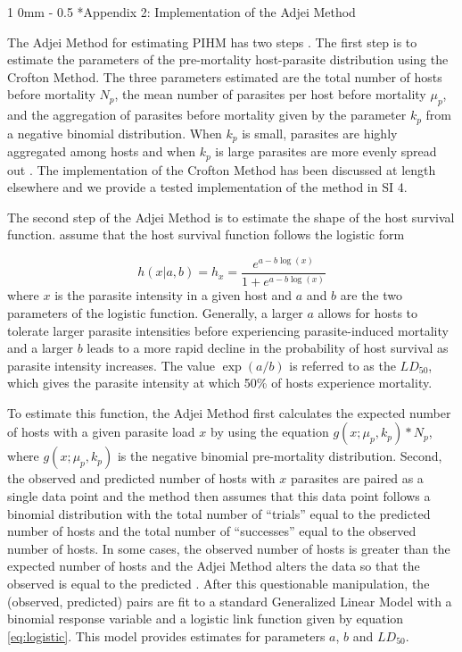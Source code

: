 \documentclass[12pt, a4paper]{article}
\makeatletter
\renewcommand{\section}{\@startsection
{section}%
{1}%
{0mm}%
{-\baselineskip}%
{0.5\baselineskip}%
{\normalfont\bf\large}} %
\makeatother
\begin{document}
\section*{Appendix 2: Implementation of the Adjei Method}

The Adjei Method for estimating PIHM has two steps \citep{Adjei1986}.  The first
step is to estimate the parameters of the pre-mortality host-parasite
distribution using the Crofton Method.  The three parameters estimated are the
total number of hosts before mortality $N_p$,  the mean number of parasites per
host before mortality $\mu_p$, and the aggregation of parasites before
mortality given by the parameter $k_p$ from a negative binomial distribution.
When $k_p$ is small, parasites are highly aggregated among hosts and when
$k_p$ is large parasites are more evenly spread out \citep{Wilson2002}.  The implementation of the Crofton Method has been discussed at length elsewhere \citep[e.g.][ and above]{Royce1990,Lester1984} and we provide a tested implementation of the method in SI 4.

The second step of the Adjei Method is to estimate the shape of the host survival function. \cite{Adjei1986} assume that the host survival function follows the logistic form

\begin{equation}
    h(x | a, b) = h_x = \dfrac{e^{a - b \log(x)}}{1 + e^{a - b \log(x)}}
    \label{eq:logistic}
\end{equation}
where $x$ is the parasite intensity in a given host and $a$ and $b$ are the two
parameters of the logistic function. Generally, a larger $a$ allows for hosts to
tolerate larger parasite intensities before experiencing parasite-induced mortality
and a larger $b$ leads to a more rapid decline in the probability of host
survival as parasite intensity increases.  The value $\exp(a / b)$ is referred
to as the $LD_{50}$, which gives the parasite intensity at which 50\% of hosts
experience mortality.

To estimate this function, the Adjei Method first
calculates the expected number of hosts with a given parasite load $x$ by using
the equation $g(x ; \mu_p, k_p) * N_p$, where $g(x ; \mu_p, k_p)$ is the negative binomial pre-mortality distribution.  Second, the observed and predicted number of hosts
with $x$ parasites are paired as a single data point and the method then assumes that
this data point follows a binomial distribution with the total number of
``trials'' equal to the predicted number of hosts and the total number of
``successes'' equal to the observed number of hosts. In some cases, the
observed number of hosts is greater than the expected number of hosts and the
Adjei Method alters the data so that the observed is equal to the predicted
\citep{Adjei1986}.  After this questionable manipulation, the (observed, predicted) pairs are fit to a standard Generalized Linear Model \citep{McCullagh1989} with a binomial response variable and a logistic link function given by equation \ref{eq:logistic}.  This model provides estimates for parameters $a$, $b$ and $LD_{50}$.
\end{document}
